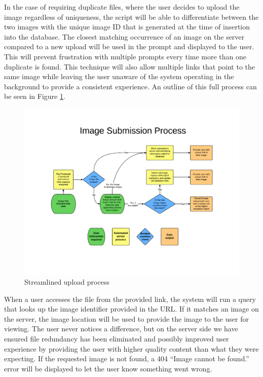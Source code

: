 In the case of requiring duplicate files, where the user decides to upload the image regardless of uniqueness, the script will be able to differentiate between the two images with the unique image ID that is generated at the time of insertion into the database. The closest matching occurrence of an image on the server compared to a new upload will be used in the prompt and displayed to the user. This will prevent frustration with multiple prompts every time more than one duplicate is found. This technique will also allow multiple links that point to the same image while leaving the user unaware of the system operating in the background to provide a consistent experience. An outline of this full process can be seen in Figure \ref{method-fig1}.

\begin{figure}[htbp]
\centering
\includegraphics[trim={3cm 3.5cm 2cm 4.2cm},clip, width=6in]{upproc}
\caption{Streamlined upload process}
\label{method-fig1}
\end{figure}

When a user accesses the file from the provided link, the system will run a query that looks up the image identifier provided in the URL. If it matches an image on the server, the image location will be used to provide the image to the user for viewing. The user never notices a difference, but on the server side we have ensured file redundancy has been eliminated and possibly improved user experience by providing the user with higher quality content than what they were expecting. If the requested image is not found, a 404 ``Image cannot be found.'' error will be displayed to let the user know something went wrong.

